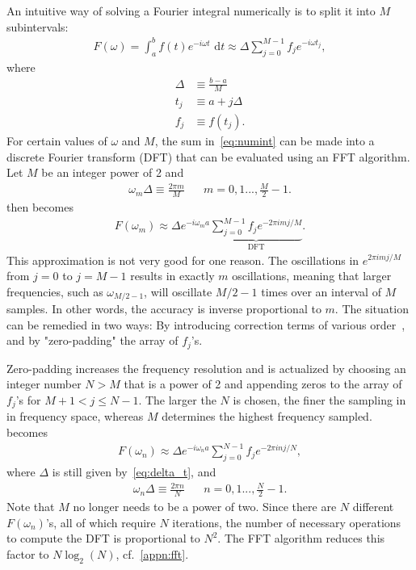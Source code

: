 \documentclass[10pt,twoside, b5paper,pdftex]{report}
\begin{document}
An intuitive way of solving a Fourier integral numerically is to split it into $M$ subintervals:
\begin{align}
 	 F(\omega) = \int^{b}_{a} f(t)  e^{-i\omega t} \mbox{ d}t \approx \Delta \sum^{M-1}_{j=0} f_{j} e^{-i\omega t_{j}} \label{eq:numint}, 
\end{align} 
where 
\begin{align}
 	 \Delta &\equiv \frac{b-a}{M} \label{eq:delta_t}\\
 	 t_{j} &\equiv a + j\Delta\\
 	 f_{j} &\equiv f(t_j) 	. 
\end{align}
For certain values of $\omega$ and $M$, the sum in~\cref{eq:numint} can be made into a discrete Fourier transform (DFT) that can be evaluated using an FFT algorithm. Let $M$ be an integer power of 2 and 
\begin{align}
	\omega_{m}\Delta \equiv \frac{2\pi m}{M} \;\;\;\;\;\; m = 0,1...,\frac{M}{2}-1.
\end{align}
  then becomes 
\begin{align}
	F(\omega_{m}) \approx \Delta e^{-i\omega_{m}a} \underbrace{\sum^{M-1}_{j=0} f_{j} e^{-2 \pi i m j / M} }_{\mbox{DFT}} .
\end{align}
This approximation is not very good for one reason. The oscillations in  $e^{2 \pi i m j/M}$ from $j = 0$ to $j=M-1$ results in exactly $m$ oscillations, meaning that larger frequencies,  such as $\omega_{M/2-1}$, will oscillate $M/2-1$ times over an interval of $M$ samples. In other words, the accuracy is inverse proportional to $m$. The situation can be remedied in two ways: By introducing correction terms of various order~\cite{NR}, and by "zero-padding" the array of $f_j$'s.  

Zero-padding increases the frequency resolution and is actualized by choosing an integer number $N>M$ that is a power of 2 and appending zeros to the array of $f_j$'s for $M+1<j\leq N-1$. The larger the $N$ is chosen, the finer the sampling in in frequency space, whereas $M$ determines the highest frequency sampled.  becomes
\begin{align}
	F(\omega_{n}) \approx \Delta e^{-i\omega_{n}a} \sum^{N-1}_{j=0} f_{j} e^{-2 \pi i  n j / N} ,\label{eq:DFT_pro}
\end{align}
where $\Delta$ is still given by~\cref{eq:delta_t}, and
\begin{align}
	\omega_{n}\Delta \equiv \frac{2\pi n}{N}  \;\;\;\;\;\; n = 0,1...,\frac{N}{2}-1.	
\end{align}
Note that $M$ no longer needs to be a power of two. Since there are $N$ different $F(\omega_{n})$'s, all of which require $N$ iterations, the number of necessary operations to compute the DFT is proportional to $N^2$. The FFT algorithm reduces this factor to $N\log_{2}(N)$, cf.~\cref{appn:fft}. 
\end{document}
